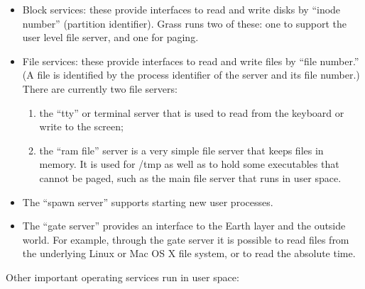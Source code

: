 \documentclass{article}
\begin{document}
\begin{itemize}

\item Block services: these provide interfaces to read and write disks
by ``inode number'' (partition identifier).
Grass runs two of these: one to support the user level file server, and
one for paging.

\item File services: these provide interfaces to read and write files
by ``file number.''  (A file is identified by the process identifier
of the server and its file number.)  There are currently two file
servers:
\begin{enumerate}
\item the ``tty'' or terminal server that is used to read from the
keyboard or write to the screen;
\item the ``ram file'' server is a very simple file server that keeps
files in memory.  It is used for /tmp as well as to hold some executables
that cannot be paged, such as the main file server that runs in user
space.
\end{enumerate}

\item The ``spawn server'' supports starting new user processes.

\item The ``gate server'' provides an interface to the Earth layer and the
outside world.  For example, through the gate server it is possible to
read files from the underlying Linux or Mac OS X file system, or to read
the absolute time.

\end{itemize}

Other important operating services run in user space:
\end{document}
